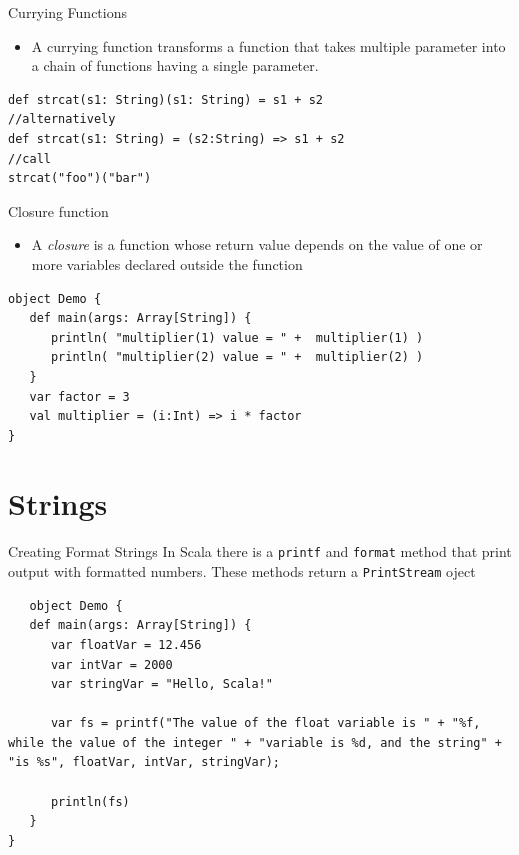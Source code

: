 \documentclass[presentation, aspectratio=169]{beamer}
\begin{document}
\begin{frame}[label={sec:org4de04ce},fragile]{Currying Functions}
 \begin{itemize}
\item A currying function transforms a function that takes multiple parameter into a chain of functions
having a single parameter.
\end{itemize}

\begin{verbatim}
def strcat(s1: String)(s1: String) = s1 + s2
//alternatively
def strcat(s1: String) = (s2:String) => s1 + s2
//call
strcat("foo")("bar")
\end{verbatim}
\end{frame}

\begin{frame}[label={sec:org12d7ca3},fragile]{Closure function}
 \begin{itemize}
\item A \emph{closure} is a function whose return value depends on the value of one or more variables declared 
outside the function
\end{itemize}

\begin{verbatim}
object Demo {
   def main(args: Array[String]) {
      println( "multiplier(1) value = " +  multiplier(1) )
      println( "multiplier(2) value = " +  multiplier(2) )
   }
   var factor = 3
   val multiplier = (i:Int) => i * factor
}
\end{verbatim}
\end{frame}

\section{Strings}
\label{sec:org3abef97}

\begin{frame}[label={sec:org5d9a2fc},fragile]{Creating Format Strings}
 In Scala there is a \texttt{printf} and \texttt{format} method that print output with formatted numbers.
These methods return a \texttt{PrintStream} oject

\begin{verbatim}
   object Demo {
   def main(args: Array[String]) {
      var floatVar = 12.456
      var intVar = 2000
      var stringVar = "Hello, Scala!"

      var fs = printf("The value of the float variable is " + "%f, while the value of the integer " + "variable is %d, and the string" + "is %s", floatVar, intVar, stringVar);

      println(fs)
   }
}
\end{verbatim}
\end{frame}
\end{document}
